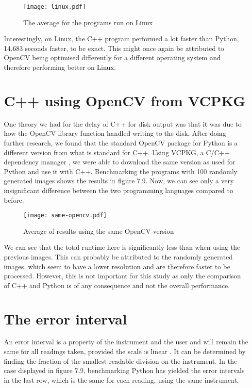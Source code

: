 \begin{figure}[H]
	\centering
	\texttt{[image: linux.pdf]}
	\caption{The average for the programs run on Linux}
	\label{figure:linux}
\end{figure}

Interestingly, on Linux, the C++ program performed a lot faster than Python, 14,683 seconds faster, to be exact. This might once again be attributed to OpenCV being optimised differently for a different operating system and therefore performing better on Linux.

\section{C++ using OpenCV from VCPKG}
One theory we had for the delay of C++ for disk output was that it was due to how the OpenCV library function handled writing to the disk. After doing further research, we found that the standard OpenCV package for Python is a different version from what is standard for C++. Using VCPKG, a C/C++ dependency manager \cite{vcpkg}, we were able to download the same version as used for Python and use it with C++. Benchmarking the programs with 100 randomly generated images shows the results in figure 7.9. Now, we can see only a very insignificant difference between the two programming languages compared to before.

\begin{figure}[H]
	\centering
	\texttt{[image: same-opencv.pdf]}
	\caption{Average of results using the same OpenCV version}
	\label{figure:same-opencv}
\end{figure}

We can see that the total runtime here is significantly less than when using the previous images. This can probably be attributed to the randomly generated images, which seem to have a lower resolution and are therefore faster to be processed. However, this is not important for this study as only the comparison of C++ and Python is of any consequence and not the overall performance.

\section{The error interval}
An error interval is a property of the instrument and the user and will remain the same for all readings taken, provided the scale is linear \cite{errorinterval}. It can be determined by finding the fraction of the smallest readable division on the instrument. In the case displayed in figure 7.9, benchmarking Python has yielded the error intervals in the last row, which is the same for each reading, using the same instrument.

